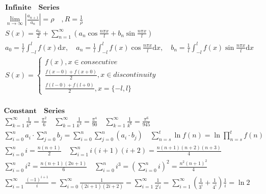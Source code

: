 \documentclass{article}
\begin{document}
\clearpage

\begin{align*}
    \mathbf{Infinite \quad Series} \\ 
    \lim_{n \to \infty} |\frac{a_{n+1}}{a_{n}}| = \rho \quad, R = \frac{1}{\rho} \\ 
    S(x) = \frac{a_{0}}{2} + \sum_{n=1}^{\infty}(a_{n}\cos{\frac{n\pi x}{l}} + b_{n}\sin{\frac{n\pi x}{l}}) \\ 
    a_{0} = \frac{1}{l}\int_{-l}^{l}f(x)\mathrm{d}x ,\quad a_{n} = \frac{1}{l}\int_{-l}^{l}f(x)\cos{\frac{n\pi x}{l}}\mathrm{d}x ,\quad b_{n} = \frac{1}{l}\int_{-l}^{l}f(x)\sin{\frac{n\pi x}{l}}\mathrm{d}x \\ 
    S(x) = \left\{ 
    \begin{array}{rl} 
        f(x),x \in consecutive \\ 
        \frac{f(x-0)+f(x+0)}{2},x \in discontinuity \\  
        \frac{f(l-0)+f(l+0)}{2},x = \{-l,l\} 
    \end{array} \right. \ \\ 
\end{align*}

\begin{align*}
    \mathbf{Constant \quad Series} \\  
    \sum_{k=1}^{\infty}{\frac{1}{k^2}} = \frac{\pi^2}{6} \quad \sum_{k=1}^{\infty}{\frac{1}{k^4}} = \frac{\pi^4}{90} \quad \sum_{k=1}^{\infty}{\frac{1}{k^6}} = \frac{\pi^6}{945} \\ 
    \sum_{i=0}^{n}{a_{i}} \cdot \sum_{j=0}^{n}{b_{j}} = \sum_{i=0}^{n}\sum_{j=0}^{n}{(a_{i} \cdot b_{j})} \quad \sum_{n=s}^{t}\ln{f(n)} = \ln{\prod_{n=s}^{t}}f(n) \\ 
    \sum_{i=0}^{n}{i} = \frac{n(n+1)}{2} \quad \sum_{i=1}^{n}i(i+1)(i+2)=\frac{n(n+1)(n+2)(n+3)}{4} \\ 
    \sum_{i=0}^{n}{i^2} = \frac{n(n+1)(2n+1)}{6} \quad \sum_{i=0}^{n}{i^3} = \left(\sum_{i=0}^{n}{i}\right)^2 = \frac{n^2(n+1)^2}{4} \\ 
    \sum_{i=1}^{\infty}{\frac{(-1)^{i+1}}{i}} = \sum_{i=0}^{\infty}{\frac{1}{(2i+1)(2i+2)}} = \sum_{i=1}^{\infty}{\frac{1}{2^i i}} = \sum_{i=1}^{\infty}({\frac{1}{3^i}+\frac{1}{4^i}})\frac{1}{i}= \ln2 \\ 
\end{align*}

\clearpage
\end{document}
